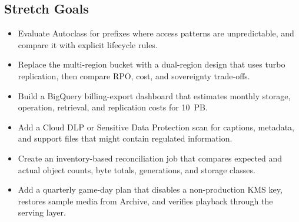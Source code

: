 \subsection*{Stretch Goals}
\begin{itemize}
    \item Evaluate Autoclass for prefixes where access patterns are unpredictable, and compare it with explicit lifecycle rules.
    \item Replace the multi-region bucket with a dual-region design that uses turbo replication, then compare RPO, cost, and sovereignty trade-offs.
    \item Build a BigQuery billing-export dashboard that estimates monthly storage, operation, retrieval, and replication costs for 10~PB.
    \item Add a Cloud DLP or Sensitive Data Protection scan for captions, metadata, and support files that might contain regulated information.
    \item Create an inventory-based reconciliation job that compares expected and actual object counts, byte totals, generations, and storage classes.
    \item Add a quarterly game-day plan that disables a non-production KMS key, restores sample media from Archive, and verifies playback through the serving layer.
\end{itemize}
